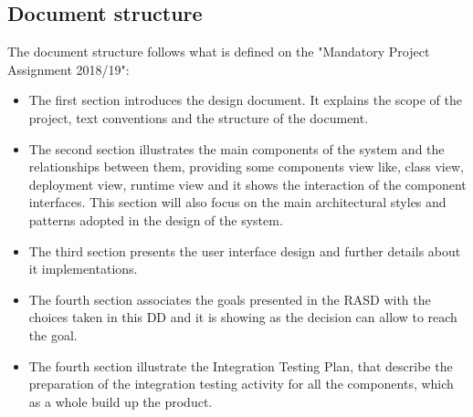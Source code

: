 \subsection{Document structure}
The document structure follows what is defined on the "Mandatory Project Assignment 2018/19":
\begin{itemize}
\item The first section introduces the design document. It explains the scope of the project, text conventions and the structure of the document.
\item The second section illustrates the main components of the system and the relationships between them, providing some components view like, class view, deployment view, runtime view and it shows the interaction of the component interfaces.  This section will also focus on the main architectural styles and patterns adopted in the design of the system.
\item The third section presents the user interface design and further details about it implementations.
\item The fourth section associates the goals presented in the RASD with the choices taken in this DD and it is showing as the decision can allow to reach the goal.
\item The fourth section illustrate the Integration Testing Plan, that describe the preparation of the integration testing activity for all the components, which as a whole build up the product.
\end{itemize}